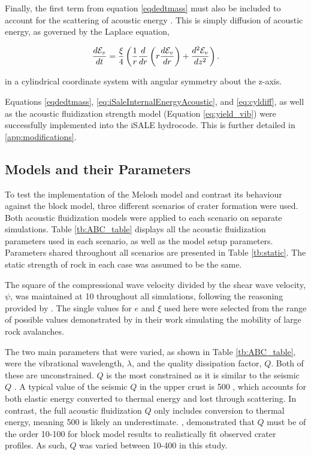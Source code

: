 Finally, the first term from equation \ref{eqdedtmass} must also be included to account for the scattering of acoustic energy \citep{collins2002numerical}. This is simply diffusion of acoustic energy, as governed by the Laplace equation, 

\begin{equation} \label{eq:cyldiff}
\frac{d \mathcal{E}_{v} }{d t} = \frac{\xi}{4}  \left( \frac{1}{r} \frac{d}{dr} \left( r \frac{d \mathcal{E}_{v}}{dr} \right) + \frac{d^{2} \mathcal{E}_{v}}{dz^{2}}   \right) .\vspace{0.2cm}
\end{equation} 

in a cylindrical coordinate system with angular symmetry about the z-axis.

Equations \ref{eqdedtmass}, \ref{eq:iSaleInternalEnergyAcoustic}, and \ref{eq:cyldiff}, as well as the acoustic fluidization strength model (Equation \ref{eq:yield_vib}) were successfully implemented into the iSALE hydrocode. This is further detailed in \ref{app:modifications}.

\subsection{Models and their Parameters}\label{sec:parameters}

To test the implementation of the Melosh model and contrast its behaviour against the block model, three different scenarios of crater formation were used. Both acoustic fluidization models were applied to each scenario on separate simulations. Table \ref{tb:ABC_table} displays all the acoustic fluidization parameters used in each scenario, as well as the model setup parameters. Parameters shared throughout all scenarios are presented in Table \ref{tb:static}. The static strength of rock in each case was assumed to be the same.





The square of the compressional wave velocity divided by the shear wave velocity, $\psi$, was maintained at 10 throughout all simulations, following the reasoning provided by \citet{collins2003acoustic}. The single values for $e$ and $\xi$ used here were selected from the range of possible values demonstrated by \citet{collins2003acoustic} in their work simulating the mobility of large rock avalanches. 

The two main parameters that were varied, as shown in Table \ref{tb:ABC_table}, were the vibrational wavelength, $\lambda$, and the quality dissipation factor, $Q$. Both of these are unconstrained. $Q$ is the most constrained as it is similar to the seismic $Q$ \citep{melosh1996dynamical}. A typical value of the seismic $Q$ in the upper crust is 500 \citep{anderson1989theory}, which accounts for both elastic energy converted to thermal energy and lost through scattering. In contrast, the full acoustic fluidization $Q$ only includes conversion to thermal energy, meaning 500 is likely an underestimate. \citet{melosh1999impact}, demonstrated that $Q$ must be of the order 10-100 for block model results to realistically fit observed crater profiles. As such, $Q$ was varied between 10-400 in this study. 

